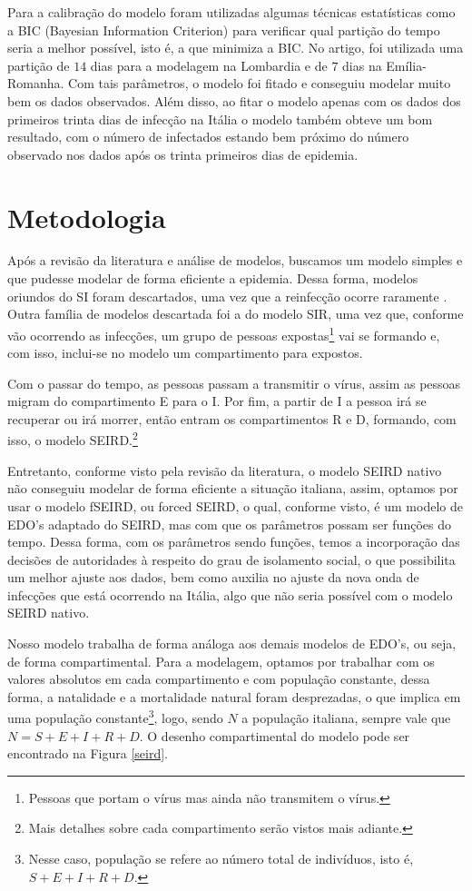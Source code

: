 \documentclass{article}
\begin{document}
Para a calibração do modelo foram utilizadas algumas técnicas estatísticas como a BIC (Bayesian Information Criterion) para verificar qual partição do tempo seria a melhor possível, isto é, a que minimiza a BIC. No artigo, foi utilizada uma partição de $14$ dias para a modelagem na Lombardia e de $7$ dias na Emília-Romanha. Com tais parâmetros, o modelo foi fitado e conseguiu modelar muito bem os dados observados. Além disso, ao fitar o modelo apenas com os dados dos primeiros trinta dias de infecção na Itália o modelo também obteve um bom resultado, com o número de infectados estando bem próximo do número observado nos dados após os trinta primeiros dias de epidemia.

\section{Metodologia}

Após a revisão da literatura e análise de modelos, buscamos um modelo simples e que pudesse modelar de forma eficiente a epidemia. Dessa forma, modelos oriundos do SI foram descartados, uma vez que a reinfecção ocorre raramente \cite{again} \cite{again2}. Outra família de modelos descartada foi a do modelo SIR, uma vez que, conforme vão ocorrendo as infecções, um grupo de pessoas expostas\footnote{Pessoas que portam o vírus mas ainda não transmitem o vírus.} vai se formando e, com isso, inclui-se no modelo um compartimento para expostos.

Com o passar do tempo, as pessoas passam a transmitir o vírus, assim as pessoas migram do compartimento E para o I. Por fim, a partir de I a pessoa irá se recuperar ou irá morrer, então entram os compartimentos R e D, formando, com isso, o modelo SEIRD.\footnote{Mais detalhes sobre cada compartimento serão vistos mais adiante.}

Entretanto, conforme visto pela revisão da literatura, o modelo SEIRD nativo não conseguiu modelar de forma eficiente a situação italiana, assim, optamos por usar o modelo fSEIRD, ou forced SEIRD, o qual, conforme visto, é um modelo de EDO's adaptado do SEIRD, mas com que os parâmetros possam ser funções do tempo. Dessa forma, com os parâmetros sendo funções, temos a incorporação das decisões de autoridades à respeito do grau de isolamento social, o que possibilita um melhor ajuste aos dados, bem como auxilia no ajuste da nova onda de infecções que está ocorrendo na Itália, algo que não seria possível com o modelo SEIRD nativo.

Nosso modelo trabalha de forma análoga aos demais modelos de EDO's, ou seja, de forma compartimental. Para a modelagem, optamos por trabalhar com os valores absolutos em cada compartimento e com população constante, dessa forma, a natalidade e a mortalidade natural foram desprezadas, o que implica em uma população constante\footnote{Nesse caso, população se refere ao número total de indivíduos, isto é, $S + E + I + R + D$.}, logo, sendo $N$ a população italiana, sempre vale que $N = S + E + I + R + D$. O desenho compartimental do modelo pode ser encontrado na Figura \ref{seird}.
\end{document}
